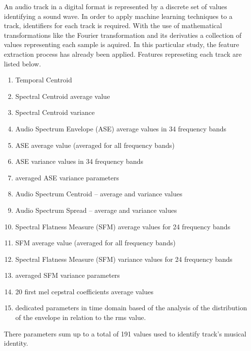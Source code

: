 An audio track in a digital format is represented by a discrete set of values identifying a sound wave. In order to apply machine learning techniques to a track, identifiers for each track is required. With the use of mathematical transformations like the Fourier transformation and its derivaties a collection of values representing each sample is aquired. In this particular study, the feature extraction process has already been applied. Features represeting each track are listed below.

\begin{enumerate}
\item Temporal Centroid 
\item Spectral Centroid average value 
\item Spectral Centroid variance
\item Audio Spectrum Envelope (ASE) average values in 34 frequency bands
\item ASE average value (averaged for all frequency bands)
\item ASE variance values in 34 frequency bands
\item averaged ASE variance parameters
\item Audio Spectrum Centroid – average and variance values
\item Audio Spectrum Spread – average and variance values
\item Spectral Flatness Measure (SFM) average values for 24 frequency bands
\item SFM average value (averaged for all frequency bands)
\item Spectral Flatness Measure (SFM) variance values for 24 frequency bands
\item averaged SFM variance parameters
\item 20 first mel cepstral coefficients average values 
\item dedicated parameters in time domain based of the analysis of the distribution of the envelope in relation to the rms value.
\end{enumerate}

There parameters sum up to a total of 191 values used to identify track's musical identity. 